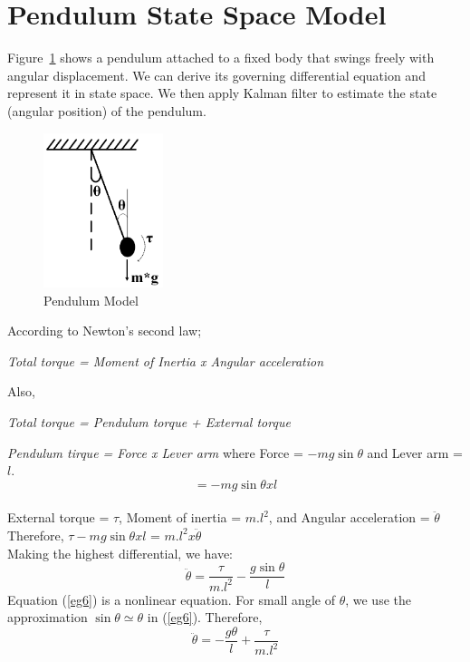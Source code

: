 \documentclass{article}
\begin{document}
\section{Pendulum State Space Model}
Figure~\ref{fig5} shows a pendulum attached to a fixed body that swings freely with angular displacement. We can derive its governing differential equation and represent it in state space. We then apply Kalman filter to estimate the state (angular position) of the pendulum.\\

\begin{figure}[h!]
\begin{center}
\includegraphics[width=3.5cm]{Simple_pendulum}
\caption{Pendulum Model}
\label{fig5}
\end{center}
\end{figure}
According to Newton's second law;
\begin{center}
\textit{Total torque = Moment of Inertia x Angular acceleration}
\end{center}
Also,
\begin{center}
\textit{Total torque = Pendulum torque + External torque}
\end{center}
\emph{Pendulum tirque = Force x Lever arm}
where Force = $-mg \sin\theta$ and Lever arm = $l$.
$$=-mg \sin\theta x l$$\\
External torque = $\tau$, Moment of inertia = $m.l^{2}$, and Angular acceleration = $\ddot{\theta} $\\
Therefore, $\tau - mg \sin\theta x l$ = $m.l^{2} x \ddot{\theta}$\\
Making the highest differential, we have:
\begin{equation}
\label{eg6}
\ddot{\theta} = \dfrac{\tau}{m.l^{2}} - \dfrac{g \sin\theta}{l}
\end{equation}
Equation (\ref{eg6}) is a nonlinear equation. For small angle of $\theta$, we use the approximation $\sin\theta\simeq\theta$ in (\ref{eg6}).
Therefore,\\
\begin{equation}
\label{eg7}
\ddot{\theta} = - \dfrac{g \theta}{l} + \dfrac{\tau}{m.l^{2}}
\end{equation}
\end{document}
